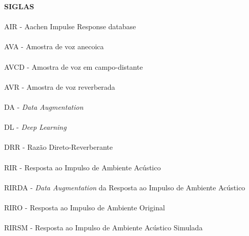 \pagebreak


\begin{center}
\textbf{SIGLAS}
\end{center}
      \vspace{0.5cm}

\paragraph{}AIR - Aachen Impulse Response database
\paragraph{}AVA - Amostra de voz anecoica
\paragraph{}AVCD - Amostra de voz em campo-distante
\paragraph{}AVR - Amostra de voz reverberada
\paragraph{}DA - \textit{Data Augmentation}
\paragraph{}DL - \textit{Deep Learning}
\paragraph{}DRR - Razão Direto-Reverberante
\paragraph{}RIR - Resposta ao Impulso de Ambiente Acústico
\paragraph{}RIRDA - \textit{Data Augmentation} da Resposta ao Impulso de Ambiente Acústico 
\paragraph{}RIRO - Resposta ao Impulso de Ambiente Original
\paragraph{}RIRSM - Resposta ao Impulso de Ambiente Acústico Simulada
